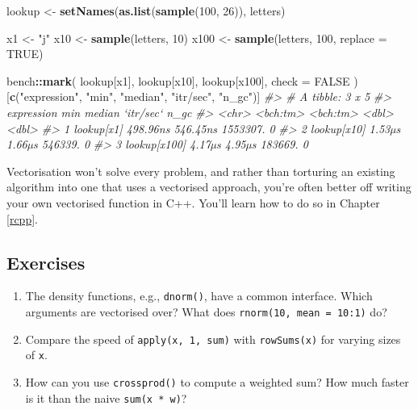 \documentclass[]{book}
\newenvironment{Shaded}{\begin{snugshade}}{\end{snugshade}}
\newcommand{\CommentTok}[1]{\textcolor[rgb]{0.37,0.37,0.37}{\textit{#1}}}
\newcommand{\DataTypeTok}[1]{\textcolor[rgb]{0.27,0.27,0.27}{#1}}
\newcommand{\DecValTok}[1]{\textcolor[rgb]{0.06,0.06,0.06}{#1}}
\newcommand{\KeywordTok}[1]{\textcolor[rgb]{0.27,0.27,0.27}{\textbf{#1}}}
\newcommand{\NormalTok}[1]{#1}
\newcommand{\OperatorTok}[1]{\textcolor[rgb]{0.43,0.43,0.43}{\textbf{#1}}}
\newcommand{\OtherTok}[1]{\textcolor[rgb]{0.37,0.37,0.37}{#1}}
\newcommand{\StringTok}[1]{\textcolor[rgb]{0.5,0.5,0.5}{#1}}
\begin{document}
\begin{Shaded}
\begin{Highlighting}[]
\NormalTok{lookup <-}\StringTok{ }\KeywordTok{setNames}\NormalTok{(}\KeywordTok{as.list}\NormalTok{(}\KeywordTok{sample}\NormalTok{(}\DecValTok{100}\NormalTok{, }\DecValTok{26}\NormalTok{)), letters)}

\NormalTok{x1 <-}\StringTok{ "j"}
\NormalTok{x10 <-}\StringTok{ }\KeywordTok{sample}\NormalTok{(letters, }\DecValTok{10}\NormalTok{)}
\NormalTok{x100 <-}\StringTok{ }\KeywordTok{sample}\NormalTok{(letters, }\DecValTok{100}\NormalTok{, }\DataTypeTok{replace =} \OtherTok{TRUE}\NormalTok{)}

\NormalTok{bench}\OperatorTok{::}\KeywordTok{mark}\NormalTok{(}
\NormalTok{  lookup[x1],}
\NormalTok{  lookup[x10],}
\NormalTok{  lookup[x100],}
  \DataTypeTok{check =} \OtherTok{FALSE}
\NormalTok{)[}\KeywordTok{c}\NormalTok{(}\StringTok{"expression"}\NormalTok{, }\StringTok{"min"}\NormalTok{, }\StringTok{"median"}\NormalTok{, }\StringTok{"itr/sec"}\NormalTok{, }\StringTok{"n_gc"}\NormalTok{)]}
\CommentTok{#> # A tibble: 3 x 5}
\CommentTok{#>   expression        min   median `itr/sec`  n_gc}
\CommentTok{#>   <chr>        <bch:tm> <bch:tm>     <dbl> <dbl>}
\CommentTok{#> 1 lookup[x1]   498.96ns 546.45ns  1553307.     0}
\CommentTok{#> 2 lookup[x10]    1.53µs   1.66µs   546339.     0}
\CommentTok{#> 3 lookup[x100]   4.17µs   4.95µs   183669.     0}
\end{Highlighting}
\end{Shaded}

Vectorisation won't solve every problem, and rather than torturing an existing algorithm into one that uses a vectorised approach, you're often better off writing your own vectorised function in C++. You'll learn how to do so in Chapter \ref{rcpp}.

\hypertarget{exercises-20}{%
\subsection{Exercises}\label{exercises-20}}

\begin{enumerate}
\def\labelenumi{\arabic{enumi}.}
\item
  The density functions, e.g., \texttt{dnorm()}, have a common interface. Which
  arguments are vectorised over? What does \texttt{rnorm(10,\ mean\ =\ 10:1)} do?
\item
  Compare the speed of \texttt{apply(x,\ 1,\ sum)} with \texttt{rowSums(x)} for varying sizes
  of \texttt{x}.
\item
  How can you use \texttt{crossprod()} to compute a weighted sum? How much faster is
  it than the naive \texttt{sum(x\ *\ w)}?
\end{enumerate}
\end{document}
